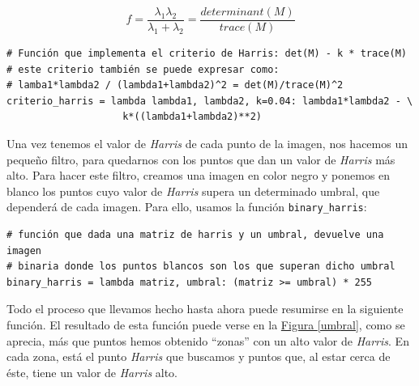 \documentclass[11pt,a4paper]{article}
\theoremstyle{plain}
\theoremstyle{definition}
\begin{document}
\begin{displaymath}
    f = \frac{\lambda_1 \lambda_2}{\lambda_1 + \lambda_2} = \frac{determinant(M)}{trace(M)}
\end{displaymath}

\begin{verbatim}
# Función que implementa el criterio de Harris: det(M) - k * trace(M)
# este criterio también se puede expresar como: 
# lamba1*lambda2 / (lambda1+lambda2)^2 = det(M)/trace(M)^2
criterio_harris = lambda lambda1, lambda2, k=0.04: lambda1*lambda2 - \
                    k*((lambda1+lambda2)**2)
\end{verbatim}

Una vez tenemos el valor de \textit{Harris} de cada punto de la imagen, nos hacemos un pequeño filtro, para quedarnos con los puntos que dan un valor de \textit{Harris} más alto. Para hacer este filtro, creamos una imagen en color negro y ponemos en blanco los puntos cuyo valor de \textit{Harris} supera un determinado umbral, que dependerá de cada imagen. Para ello, usamos la función \texttt{binary\_harris}:

\begin{verbatim}
# función que dada una matriz de harris y un umbral, devuelve una imagen 
# binaria donde los puntos blancos son los que superan dicho umbral
binary_harris = lambda matriz, umbral: (matriz >= umbral) * 255
\end{verbatim}

Todo el proceso que llevamos hecho hasta ahora puede resumirse en la siguiente función. El resultado de esta función puede verse en la \hyperref[umbral]{Figura \ref*{umbral}}, como se aprecia, más que puntos hemos obtenido ``zonas'' con un alto valor de \textit{Harris}. En cada zona, está el punto \textit{Harris} que buscamos y puntos que, al estar cerca de éste, tiene un valor de \textit{Harris} alto. 
\end{document}
